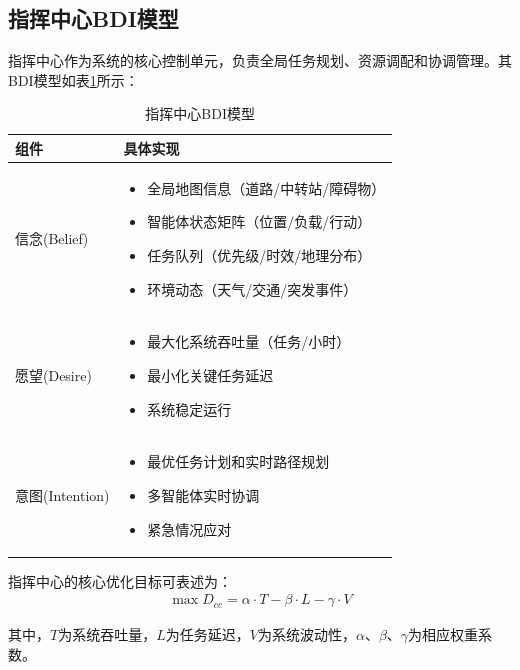 \documentclass[12pt,a4paper]{article}
\begin{document}
\subsection{指挥中心BDI模型}

指挥中心作为系统的核心控制单元，负责全局任务规划、资源调配和协调管理。其BDI模型如表\ref{tab:command-center-bdi}所示：

\begin{table}[h]
	\centering
	\caption{指挥中心BDI模型}
	\label{tab:command-center-bdi}
	\begin{tabular}{|>{\centering\arraybackslash}p{3cm}|>{\raggedright\arraybackslash}p{11cm}|}
		\hline
		\textbf{组件} & \textbf{具体实现} \\
		\hline
		\rowcolor{lightgray}
		信念(Belief) & 
		\begin{itemize}[leftmargin=*,nosep]
			\item 全局地图信息（道路/中转站/障碍物）
			\item 智能体状态矩阵（位置/负载/行动）
			\item 任务队列（优先级/时效/地理分布）
			\item 环境动态（天气/交通/突发事件）
		\end{itemize} \\
		\hline
		愿望(Desire) & 
		\begin{itemize}[leftmargin=*,nosep]
			\item 最大化系统吞吐量（任务/小时）
			\item 最小化关键任务延迟
			\item 系统稳定运行
		\end{itemize} \\
		\hline
		\rowcolor{lightgray}
		意图(Intention) & 
		\begin{itemize}[leftmargin=*,nosep]
			\item 最优任务计划和实时路径规划
			\item 多智能体实时协调
			\item 紧急情况应对
		\end{itemize} \\
		\hline
	\end{tabular}
\end{table}

指挥中心的核心优化目标可表述为：
\begin{align}
\max D_{cc} = \alpha \cdot T - \beta \cdot L - \gamma \cdot V
\end{align}

其中，$T$为系统吞吐量，$L$为任务延迟，$V$为系统波动性，$\alpha$、$\beta$、$\gamma$为相应权重系数。
\end{document}

